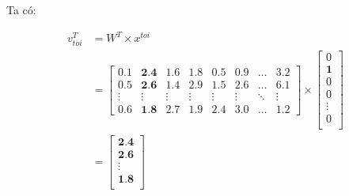 Ta có:
\begin{center}
    \begin{equation}
    \begin{split}
        v^T_{toi} & = W^T\times x^{toi} \\
        & = 
        \begin{bmatrix}
            0.1 & \textbf{2.4} & 1.6 & 1.8 & 0.5 & 0.9 & \dots & 3.2 \\
            0.5 & \textbf{2.6} & 1.4 & 2.9 & 1.5 & 2.6 & \dots & 6.1 \\
            \vdots & \vdots & \vdots & \vdots & \vdots & \vdots & \ddots & \vdots \\
            0.6 & \textbf{1.8} & 2.7 & 1.9 & 2.4 & 3.0 & \dots & 1.2
        \end{bmatrix} \times 
        \begin{bmatrix}
            0\\
            \textbf{1} \\
            0 \\
            0 \\
            \vdots \\
            0 \\
        \end{bmatrix} \\
        & = 
        \begin{bmatrix}
            \textbf{2.4} \\
            \textbf{2.6} \\
            \vdots \\
            \textbf{1.8} \\
        \end{bmatrix}
    \end{split}
    \end{equation}
\end{center}
\vspace{5mm} %
